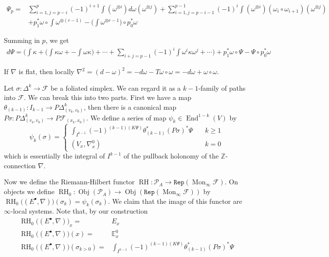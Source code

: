 \documentclass[12pt]{amsart}
\theoremstyle{definition}
\theoremstyle{remark}
\numberwithin{equation}{section}
\newcommand{\CF}{{\mathcal F}}
\newcommand{\A}{{A}}
\newcommand{\Z}{{\mathbb{Z}}}
\newcommand{\1}{{\mathbb{1}}}
\newcommand{\ob}{\operatorname{Obj}}
\newcommand{\repi}{\mathtt{Rep}}
\newcommand{\RH}{\operatorname{RH}}
\newcommand{\End}{\operatorname{End}}
\newcommand{\mon}{\operatorname{Mon}}
\begin{document}
\begin{align*}
	\Psi_p =& \sum_{i=1, j = p-i}^{p}(-1)^{i+1}\int(\omega^{\otimes i})d\omega (\omega^{\otimes j} ) + \sum_{i=1, j = p-i-1}^{p-1}(-1)^i\int (\omega^{\otimes i})(\omega_i \circ \omega_{i+1})(\omega^{\otimes j})\\
	&+ p_1^*\omega\circ \int \omega^{\otimes (r-1)} - \big(\int \omega^{\otimes r-1}\big)\circ p_0^*\omega^{}
	\end{align*}

Summing in $p$, we get 
\begin{align*}
	d \Psi = \bigg(\int \kappa + \big(\int \kappa \omega +- \int \omega \kappa\big) + \cdots + \sum_{i+j =p-1}(-1)^i\int \omega^i \kappa \omega^j + \cdots \bigg) + p_1^*\omega\circ \Psi - \Psi\circ p_0^*\omega^{}
	\end{align*}

If $\nabla$ is flat, then locally $\nabla^2 = (d -\omega)^2 = -d\omega - T\omega\circ \omega = -d\omega + \omega\circ \omega$.


Let $\sigma: \Delta^k \to \CF$ be a foliated simplex. We can regard it as a $k-1$-family of paths into $\CF$. We can break this into two parts. First we have a map $\theta_{(k-1)}: I_{k-1} \to P\Delta^k_{(v_k, v_0)}$, then there is a canonical map $P\sigma: P\Delta^k_{(v_k, v_0)} \to P\CF_{(x_k, x_0)}$. We define a series of map $\psi_k \in \End^{1-k}(V)$ by
$$\psi_k(\sigma) =
\begin{cases} \int_{I^{k-1}} (-1)^{(k-1)(K\Psi)} \theta^*_{(k-1)} (P\sigma)^* \Psi &\quad k \ge 1\\
(V_x, \nabla^0_x) &\quad k =0 
\end{cases}
$$
which is essentially the integral of $I^{k-1}$ of the pullback holonomy of the $\Z$-connection $\nabla$.


Now we define the Riemann-Hilbert functor $\RH: \mathcal{P}_{\A} \to \repi(\mon_{\infty}\CF)$. On objects we define $\RH_0 : \ob(\mathcal{P}_{\A}) \to \ob(\repi(\mon_{\infty}\CF))$ by $\RH_0\big((E^{\bullet}, \nabla) \big)(\sigma_k) = \psi_k(\sigma_k)$. We claim that the image of this functor are $\infty$-local systems. Note that, by our construction
\begin{align*}
    \RH_0\big((E^{\bullet}, \nabla) \big)_x =& E_x\\
    \RH_0\big((E^{\bullet}, \nabla) \big)(x) =& \mathbb{E}^0_x\\
    \RH_0\big((E^{\bullet}, \nabla) \big)(\sigma_{k>0}) =& \int_{I^{k-1}} (-1)^{(k-1)(K\Psi)} \theta^*_{(k-1)} (P\sigma)^* \Psi
\end{align*}
\end{document}
